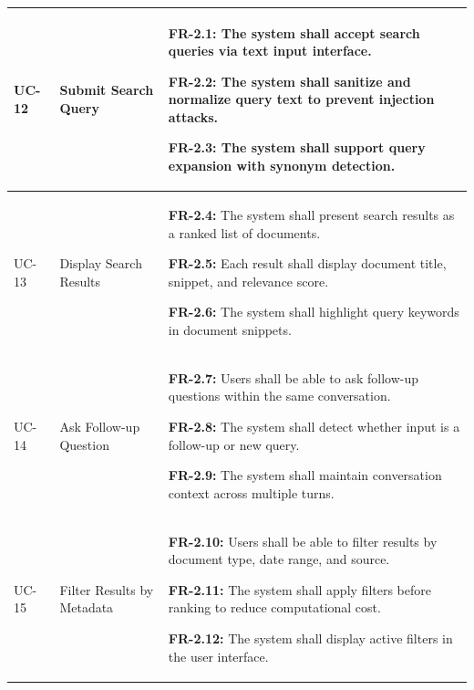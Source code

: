 \begin{longtable}{|>{\raggedright\arraybackslash}p{}|>{\raggedright\arraybackslash}p{}|>{\raggedright\arraybackslash}p{}|}
UC-12 & Submit Search Query &
\begin{frequirements}
\item \textbf{FR-2.1:} The system shall accept search queries via text input interface.
\item \textbf{FR-2.2:} The system shall sanitize and normalize query text to prevent injection attacks.
\item \textbf{FR-2.3:} The system shall support query expansion with synonym detection.
\end{frequirements} \\
\hline

UC-13 & Display Search Results &
\begin{frequirements}
\item \textbf{FR-2.4:} The system shall present search results as a ranked list of documents.
\item \textbf{FR-2.5:} Each result shall display document title, snippet, and relevance score.
\item \textbf{FR-2.6:} The system shall highlight query keywords in document snippets.
\end{frequirements} \\
\hline

UC-14 & Ask Follow-up Question &
\begin{frequirements}
\item \textbf{FR-2.7:} Users shall be able to ask follow-up questions within the same conversation.
\item \textbf{FR-2.8:} The system shall detect whether input is a follow-up or new query.
\item \textbf{FR-2.9:} The system shall maintain conversation context across multiple turns.
\end{frequirements} \\
\hline

UC-15 & Filter Results by Metadata &
\begin{frequirements}
\item \textbf{FR-2.10:} Users shall be able to filter results by document type, date range, and source.
\item \textbf{FR-2.11:} The system shall apply filters before ranking to reduce computational cost.
\item \textbf{FR-2.12:} The system shall display active filters in the user interface.
\end{frequirements} \\
\hline


\end{longtable}
